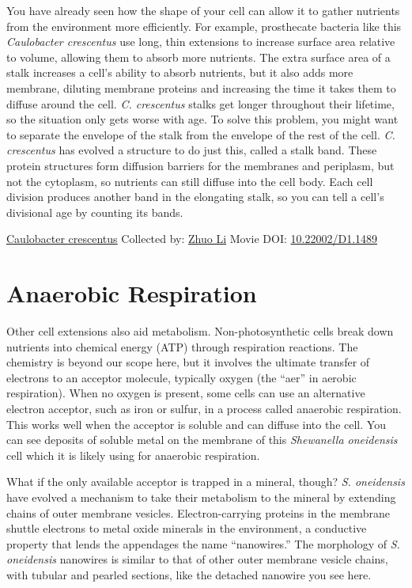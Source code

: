\documentclass[]{tufte-book}
\begin{document}
You have already seen how the shape of your cell can allow it to gather nutrients from the environment more efficiently. For example, prosthecate bacteria like this \emph{Caulobacter crescentus} use long, thin extensions to increase surface area relative to volume, allowing them to absorb more nutrients. The extra surface area of a stalk increases a cell's ability to absorb nutrients, but it also adds more membrane, diluting membrane proteins and increasing the time it takes them to diffuse around the cell. \emph{C. crescentus} stalks get longer throughout their lifetime, so the situation only gets worse with age. To solve this problem, you might want to separate the envelope of the stalk from the envelope of the rest of the cell. \emph{C. crescentus} has evolved a structure to do just this, called a stalk band. These protein structures form diffusion barriers for the membranes and periplasm, but not the cytoplasm, so nutrients can still diffuse into the cell body. Each cell division produces another band in the elongating stalk, so you can tell a cell's divisional age by counting its bands.



\hypertarget{htmlwidget-f138c27290ae7397ab10}{}

\label{fig:4-1}\protect\hyperlink{tree}{Caulobacter crescentus} Collected by: \protect\hyperlink{zhuo_li}{Zhuo Li} Movie DOI: \href{https://doi.org/10.22002/D1.1489}{10.22002/D1.1489}

\hypertarget{anaerobic-respiration}{%
\section{Anaerobic Respiration}\label{anaerobic-respiration}}

Other cell extensions also aid metabolism. Non-photosynthetic cells break down nutrients into chemical energy (ATP) through respiration reactions. The chemistry is beyond our scope here, but it involves the ultimate transfer of electrons to an acceptor molecule, typically oxygen (the ``aer'' in aerobic respiration). When no oxygen is present, some cells can use an alternative electron acceptor, such as iron or sulfur, in a process called anaerobic respiration. This works well when the acceptor is soluble and can diffuse into the cell. You can see deposits of soluble metal on the membrane of this \emph{Shewanella oneidensis} cell which it is likely using for anaerobic respiration.

What if the only available acceptor is trapped in a mineral, though? \emph{S. oneidensis} have evolved a mechanism to take their metabolism to the mineral by extending chains of outer membrane vesicles. Electron-carrying proteins in the membrane shuttle electrons to metal oxide minerals in the environment, a conductive property that lends the appendages the name ``nanowires.'' The morphology of \emph{S. oneidensis} nanowires is similar to that of other outer membrane vesicle chains, with tubular and pearled sections, like the detached nanowire you see here.
\end{document}
